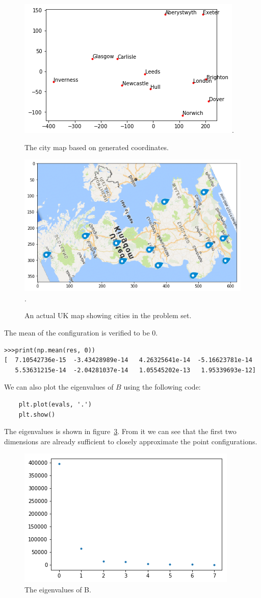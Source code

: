 \documentclass{article}
\begin{document}
\begin{figure}[h!]
\centering
\includegraphics[width=0.6\linewidth]{../images/1.png}.
\caption{The city map based on generated coordinates.}
\label{fig:city_map_problem1}
\end{figure}
\begin{figure}[h!]
\centering
\includegraphics[width=0.6\linewidth]{../images/uk_map.png}.
\caption{An actual UK map showing cities in the problem set.}
\label{fig:uk_map}
\end{figure}

The mean of the configuration is verified to be 0.
\begin{lstlisting}
>>>print(np.mean(res, 0))
[  7.10542736e-15  -3.43428989e-14   4.26325641e-14  -5.16623781e-14
   5.53631215e-14  -2.04281037e-14   1.05545202e-13   1.95339693e-12]
\end{lstlisting}
	
We can also plot the eigenvalues of $B$ using the following code:
\begin{lstlisting}
	plt.plot(evals, '.')
	plt.show()
\end{lstlisting}
The eigenvalues is shown in figure~\ref{fig:eval}. From it we can see that the first two dimensions are already sufficient to closely approximate the point configurations. 

\begin{figure}[h!]
\centering
\includegraphics[width=0.6\linewidth]{../images/2.png}
\caption{The eigenvalues of B.}
\label{fig:eval}
\end{figure}
\end{document}
